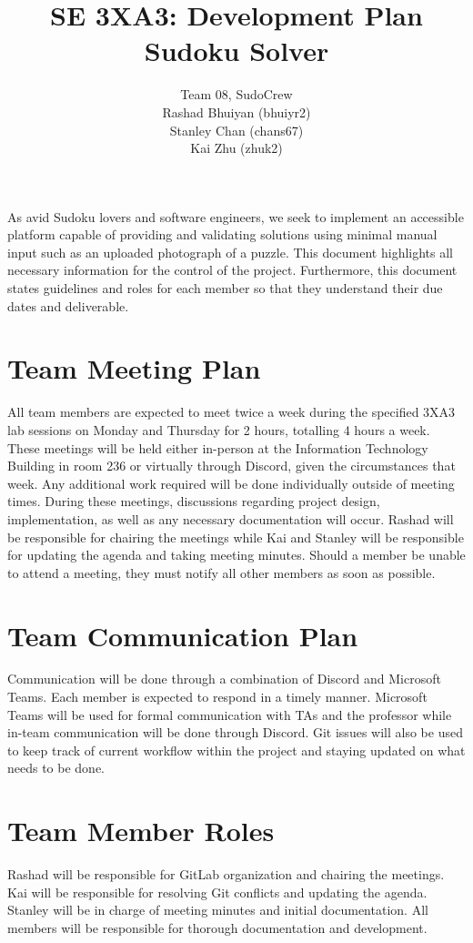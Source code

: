 \documentclass[11pt]{article}
\title{SE 3XA3: Development Plan\\Sudoku Solver}
\author{Team 08, SudoCrew
		\\ Rashad Bhuiyan (bhuiyr2)
		\\ Stanley Chan (chans67)
		\\ Kai Zhu (zhuk2)
}
\date{}
\begin{document}
\maketitle

 As avid Sudoku lovers and software engineers, we seek to implement an accessible platform capable of providing and validating solutions using minimal manual input such as an uploaded photograph of a puzzle. This document highlights all necessary information for the control of the project. Furthermore, this document states guidelines and roles for each member so that they understand their due dates and deliverable.

\section{Team Meeting Plan}
All team members are expected to meet twice a week during the specified 3XA3 lab sessions on Monday and Thursday for 2 hours, totalling 4 hours a week. These meetings will be held either in-person at the Information Technology Building in room 236 or virtually through Discord, given the circumstances that week. Any additional work required will be done individually outside of meeting times. During these meetings, discussions regarding project design, implementation, as well as any necessary documentation will occur. Rashad will be responsible for chairing the meetings while Kai and Stanley will be responsible for updating the agenda and taking meeting minutes. Should a member be unable to attend a meeting, they must notify all other members as soon as possible. 

\section{Team Communication Plan}
Communication will be done through a combination of Discord and Microsoft Teams. Each member is expected to respond in a timely manner. Microsoft Teams will be used for formal communication with TAs and the professor while in-team communication will be done through Discord. Git issues will also be used to keep track of current workflow within the project and staying updated on what needs to be done.

\section{Team Member Roles}
Rashad will be responsible for GitLab organization and chairing the meetings. Kai will be responsible for resolving Git conflicts and updating the agenda. Stanley will be in charge of meeting minutes and initial documentation. All members will be responsible for thorough documentation and development.
\end{document}
